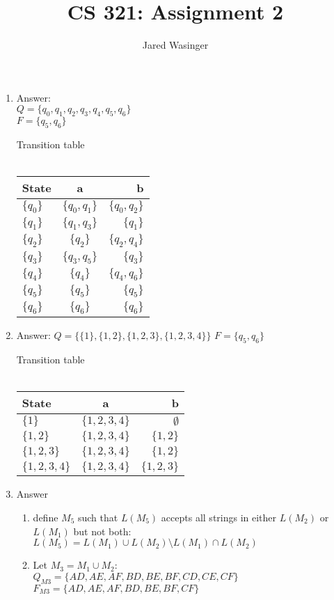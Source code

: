 \documentclass{article}
\begin{document}
  \title{CS 321: Assignment 2}
  \author{Jared Wasinger}

  \maketitle

  \begin{enumerate}
    \item Answer:\\
      $Q = \{q_0, q_1, q_2, q_3, q_4, q_5, q_6\}$\\
      $F = \{q_5, q_6\}$

      Transition table\\\\
      \begin{tabular}{ l | c | r }
        State & a & b \\ \hline
        $\{q_0\}$ & $\{q_0, q_1\}$ & $\{q_0, q_2\}$ \\

        $\{q_1\}$ & $\{q_1, q_3\}$ & $\{q_1\}$ \\

        $\{q_2\}$ & $\{q_2\}$ & $\{q_2, q_4\}$ \\

        $\{q_3\}$ & $\{q_3, q_5\}$ & $\{q_3\}$ \\

        $\{q_4\}$ & $\{q_4\}$ & $\{q_4, q_6\}$ \\

        $\{q_5\}$ & $\{q_5\}$ & $\{q_5\}$ \\

        $\{q_6\}$ & $\{q_6\}$ & $\{q_6\}$ \\
      \end{tabular}
    \item Answer:
      $Q = \{\{1\}, \{1,2\}, \{1,2,3\}, \{1,2,3,4\}\}$
      $F = \{q_5, q_6\}$

      Transition table\\\\
      \begin{tabular}{ l | c | r }
        State & a & b \\ \hline
        $\{1\}$ & $\{1,2,3,4\}$ & $\emptyset$ \\
        $\{1, 2\}$ & $\{1,2,3,4\}$ & $\{1,2\}$ \\
        $\{1, 2, 3\}$ & $\{1,2,3,4\}$ & $\{1,2\}$ \\
        $\{1,2,3,4\}$ & $\{1,2,3,4\}$ & $\{1,2,3\}$ \\
      \end{tabular}
    \item Answer
      \begin{enumerate}
        \item define $M_5$ such that $L(M_5)$ accepts all strings in either $L(M_2)$ or $L(M_1)$ but not both: $L(M_5) = L(M_1) \cup L(M_2) \setminus L(M_1) \cap L(M_2)$
        \item Let $M_3 = M_1 \cup M_2$:\\
          $Q_{M3} = \{AD, AE, AF, BD, BE, BF, CD, CE, CF\}$
          $F_{M3} = \{AD, AE, AF, BD, BE, BF, CF\}$
          

\end{enumerate}
\end{enumerate}
\end{document}
